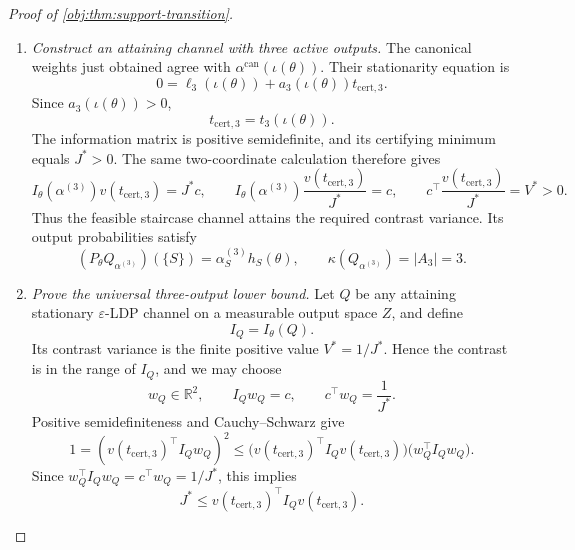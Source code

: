 \begin{proof}[Proof of \cref{obj:thm:support-transition}]
\begin{enumerate}
For any feasible weights supported on \(A_3\), the normalization rows are
\[
\begin{aligned}
3\beta_{S_1}+\beta_{S_6}+\beta_{S_8}&=1,\\
\beta_{S_1}+3\beta_{S_6}+\beta_{S_8}&=1,\\
\beta_{S_1}+\beta_{S_6}+3\beta_{S_8}&=1,
\end{aligned}
\]
with the second row also applying to the other record in \(S_6\). Subtraction and substitution give
\[
\beta_{S_1}=\beta_{S_6}=\beta_{S_8}=\frac15.
\]
These equations apply both to \(\alpha^{(3)}\) and to every feasible optimal \(\beta\). Consequently,
\[
\alpha^{(3)}_S=
\begin{cases}
1/5,&S\in A_3,\\
0,&S\notin A_3,
\end{cases}
\qquad
\beta=\alpha^{(3)}.
\]

\item \emph{Construct an attaining channel with three active outputs.}
The canonical weights just obtained agree with
\(\alpha^{\mathrm{can}}(\iota(\theta))\). Their stationarity equation is
\[
0=\ell_3(\iota(\theta))+a_3(\iota(\theta))t_{\mathrm{cert},3}.
\]
Since \(a_3(\iota(\theta))>0\),
\[
t_{\mathrm{cert},3}=t_3(\iota(\theta)).
\]
The information matrix is positive semidefinite, and its certifying minimum equals \(J^*>0\). The same two-coordinate calculation therefore gives
\[
I_\theta(\alpha^{(3)})v(t_{\mathrm{cert},3})=J^*c,
\qquad
I_\theta(\alpha^{(3)})
 \frac{v(t_{\mathrm{cert},3})}{J^*}=c,
\qquad
c^\top\frac{v(t_{\mathrm{cert},3})}{J^*}=V^*>0.
\]
Thus the feasible staircase channel attains the required contrast variance. Its output probabilities satisfy
\[
(P_\theta Q_{\alpha^{(3)}})(\{S\})
=\alpha^{(3)}_S h_S(\theta),
\qquad
\kappa(Q_{\alpha^{(3)}})=|A_3|=3.
\]

\item \emph{Prove the universal three-output lower bound.}
Let \(Q\) be any attaining stationary \(\varepsilon\)-LDP channel on a measurable output space \(Z\), and define
\[
I_Q=I_\theta(Q).
\]
Its contrast variance is the finite positive value \(V^*=1/J^*\). Hence the contrast is in the range of \(I_Q\), and we may choose
\[
w_Q\in\mathbb R^2,\qquad
I_Qw_Q=c,\qquad
c^\top w_Q=\frac1{J^*}.
\]
Positive semidefiniteness and Cauchy--Schwarz give
\[
1=(v(t_{\mathrm{cert},3})^\top I_Qw_Q)^2
\le
\bigl(v(t_{\mathrm{cert},3})^\top I_Qv(t_{\mathrm{cert},3})\bigr)
 \bigl(w_Q^\top I_Qw_Q\bigr).
\]
Since \(w_Q^\top I_Qw_Q=c^\top w_Q=1/J^*\), this implies
\[
J^*\le
v(t_{\mathrm{cert},3})^\top I_Qv(t_{\mathrm{cert},3}).
\]


\end{enumerate}
\end{proof}
